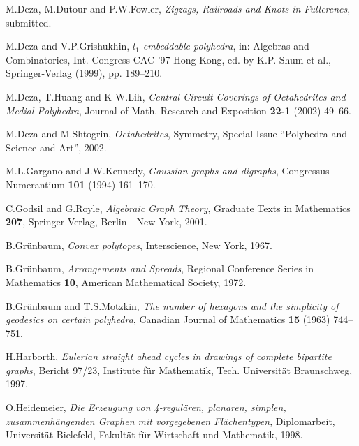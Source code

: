 \documentclass[12pt]{article}
\begin{document}
\begin{thebibliography}{99}



M.Deza, M.Dutour and P.W.Fowler,
{\em Zigzags, Railroads and Knots in Fullerenes},
submitted.


M.Deza and V.P.Grishukhin,
{\em $l_1$-embeddable polyhedra},
in: Algebras and Combinatorics, Int. Congress CAC '97 Hong Kong,
ed. by K.P. Shum et al., Springer-Verlag (1999), pp. 189--210.


M.Deza, T.Huang and K-W.Lih,
{\em Central Circuit Coverings of Octahedrites and Medial Polyhedra},
Journal of Math. Research and Exposition {\bf 22-1} (2002) 49--66.


M.Deza and M.Shtogrin,
{\em Octahedrites}, 
Symmetry, Special Issue ``Polyhedra and Science and Art'', 2002.


M.L.Gargano and J.W.Kennedy,
{\em Gaussian graphs and digraphs}, Congressus Numerantium {\bf 101}
(1994) 161--170.


C.Godsil and G.Royle, {\em Algebraic Graph Theory}, Graduate Texts in 
Mathematics {\bf 207}, Springer-Verlag, Berlin - New York, 2001.


B.Gr\"{u}nbaum, {\em Convex polytopes}, Interscience, New York, 1967.


B.Gr\"{u}nbaum, {\em Arrangements and Spreads}, Regional Conference Series in
Mathematics {\bf 10}, American Mathematical Society, 1972.


B.Gr\"{u}nbaum and T.S.Motzkin, {\em The number of hexagons and the simplicity
of geodesics on certain polyhedra}, Canadian Journal of Mathematics {\bf 15} (1963) 744--751.


H.Harborth, {\em Eulerian straight ahead cycles in drawings of complete
bipartite graphs}, Bericht 97/23, Institute f\"{u}r Mathematik, Tech. 
Universit\"{a}t
Braunschweg, 1997.


O.Heidemeier, {\em Die Erzeugung von 4-regul\"{a}ren, planaren,
simplen, zusammenh\"{a}ngenden Graphen mit vorgegebenen Fl\"{a}chentypen},
Diplomarbeit, Universit\"{a}t Bielefeld, Fakult\"{a}t f\"{u}r Wirtschaft und
Mathematik, 1998. 


\end{thebibliography}
\end{document}
